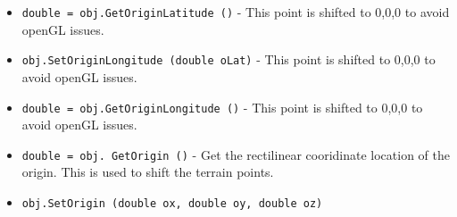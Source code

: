 \begin{itemize}
\item  \verb|double = obj.GetOriginLatitude ()| -  This point is shifted to 0,0,0 to avoid openGL issues.

\item  \verb|obj.SetOriginLongitude (double oLat)| -  This point is shifted to 0,0,0 to avoid openGL issues.

\item  \verb|double = obj.GetOriginLongitude ()| -  This point is shifted to 0,0,0 to avoid openGL issues.

\item  \verb|double = obj. GetOrigin ()| -  Get the rectilinear cooridinate location of the origin.
 This is used to shift the terrain points.

\item  \verb|obj.SetOrigin (double ox, double oy, double oz)|

\end{itemize}
